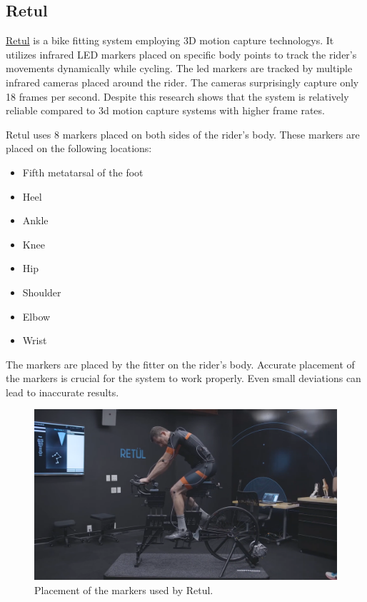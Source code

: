 \subsection{Retul}
\href{https://www.retul.com/}{Retul} is a bike fitting system employing 3D motion capture technologys. It utilizes infrared LED markers placed on specific body points to track the rider's movements dynamically while cycling. The led markers are tracked by multiple infrared cameras placed around the rider. The cameras surprisingly capture only 18 frames per second. Despite this research \cite{retulReliability} shows that the system is relatively reliable compared to 3d motion capture systems with higher frame rates.

Retul uses 8 markers placed on both sides of the rider's body. These markers are placed on the following locations:

\begin{itemize}
    \item Fifth metatarsal of the foot
    \item Heel
    \item Ankle
    \item Knee
    \item Hip
    \item Shoulder
    \item Elbow
    \item Wrist
\end{itemize}

The markers are placed by the fitter on the rider's body. Accurate placement of the markers is crucial for the system to work properly. Even small deviations can lead to inaccurate results.

\begin{figure}[htbp]
    \centering
    \includegraphics[width=\textwidth]{obrazky-figures/retul_markers.png}
    \caption{Placement of the markers used by Retul.}
    \label{fig:retul_markers}
\end{figure}

